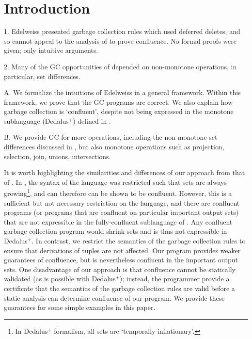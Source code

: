 
\section{Introduction}
\label{sec:intro}

1. Edelweiss presented garbage collection rules which used deferred deletes, and so cannot appeal to the analysis of \cite{marczak2012confluence} to prove confluence.
No formal proofs were given; only intuitive arguments.

2. Many of the GC opportunities of \cite{conway2014edelweiss} depended on non-monotone operations, in particular, set differences.

A. We formalize the intuitions of Edelweiss in a general framework.
Within this framework, we prove that the GC programs are correct.
We also explain how garbage collection is `confluent', despite not being expressed in the monotone sublanguage (Dedalus$^+$) defined in \cite{marczak2012confluence}.

B. We provide GC for more operations, including the non-monotone set differences discussed in \cite{conway2014edelweiss}, but also monotone operations such as projection, selection, join, unions, intersections.


It is worth highlighting the similarities and differences of our approach from that of \cite{marczak2012confluence}.
In \cite{marczak2012confluence}, the syntax of the language was restricted such that sets are always growing\footnote{In Dedalus$^+$ formalism, all sets are `temporally inflationary'.}, and can therefore can be shown to be confluent.
However, this is a sufficient but not necessary restriction on the language, and there are confluent programs (or programs that are confluent on particular important output sets) that are not expressible in the fully-confluent sublanguage of \cite{marczak2012confluence}.
Any confluent garbage collection program would shrink sets and is thus not expressible in Dedalus$^+$.
In contrast, we restrict the semantics of the garbage collection rules to ensure that derivations of tuples are not affected.
Our program provides weaker guarantees of confluence, but is nevertheless confluent in the important output sets.
One disadvantage of our approach is that confluence cannot be statically validated (as is possible with Dedalus$^+$);
instead, the programmer provide a certificate that the semantics of the garbage collection rules are valid before a static analysis can determine confluence of our program.
We provide these guarantees for some simple examples in this paper.


